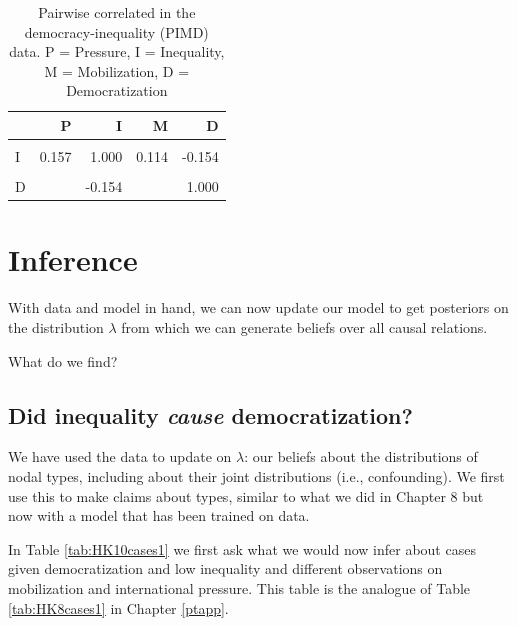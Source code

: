 \documentclass[
  12pt,
]{book}
\begin{document}
\begin{table}

\caption{\label{tab:pimdcorr}Pairwise correlated in the democracy-inequality (PIMD) data. P = Pressure, I = Inequality, M = Mobilization, D = Democratization}
\centering
\begin{tabular}[t]{lrrrr}
\toprule
  & P & I & M & D\\
\midrule
\cellcolor{gray!6}{P} & \cellcolor{gray!6}{1.000} & \cellcolor{gray!6}{0.157} & \cellcolor{gray!6}{-0.177} & \cellcolor{gray!6}{}\\
I & 0.157 & 1.000 & 0.114 & -0.154\\
\cellcolor{gray!6}{M} & \cellcolor{gray!6}{-0.177} & \cellcolor{gray!6}{0.114} & \cellcolor{gray!6}{1.000} & \cellcolor{gray!6}{}\\
D &  & -0.154 &  & 1.000\\
\bottomrule
\end{tabular}
\end{table}

\hypertarget{inference-1}{%
\section{Inference}\label{inference-1}}

With data and model in hand, we can now update our model to get posteriors on the distribution \(\lambda\) from which we can generate beliefs over all causal relations.

What do we find?

\hypertarget{did-inequality-cause-democratization}{%
\subsection{\texorpdfstring{Did inequality \emph{cause} democratization?}{Did inequality cause democratization?}}\label{did-inequality-cause-democratization}}

We have used the data to update on \(\lambda\): our beliefs about the distributions of nodal types, including about their joint distributions (i.e., confounding). We first use this to make claims about types, similar to what we did in Chapter 8 but now with a model that has been trained on data.

In Table \ref{tab:HK10cases1} we first ask what we would now infer about cases given democratization and low inequality and different observations on mobilization and international pressure. This table is the analogue of Table \ref{tab:HK8cases1} in Chapter \ref{ptapp}.
\end{document}
